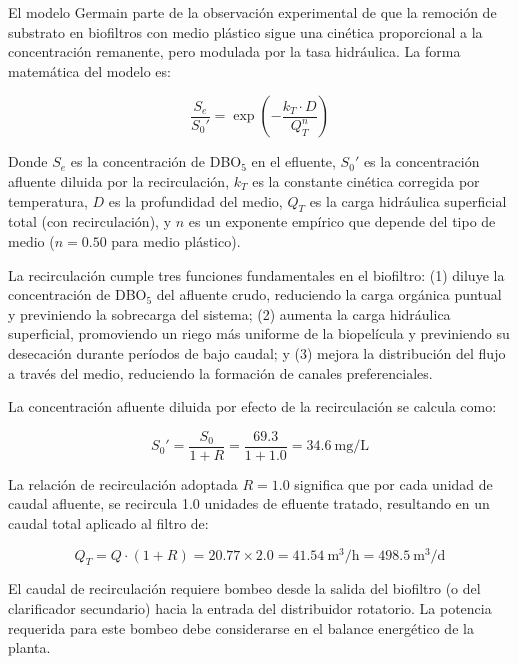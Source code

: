 \documentclass[12pt,a4paper]{article}
\begin{document}
El modelo Germain parte de la observación experimental de que la remoción de substrato en biofiltros con medio plástico sigue una cinética proporcional a la concentración remanente, pero modulada por la tasa hidráulica. La forma matemática del modelo es:

\begin{equation}
\frac{S_e}{S_0'} = \exp\!\left(-\frac{k_T \cdot D}{Q_T^n}\right)
\end{equation}

Donde $S_e$ es la concentración de DBO$_5$ en el efluente, $S_0'$ es la concentración afluente diluida por la recirculación, $k_T$ es la constante cinética corregida por temperatura, $D$ es la profundidad del medio, $Q_T$ es la carga hidráulica superficial total (con recirculación), y $n$ es un exponente empírico que depende del tipo de medio ($n = 0.50$ para medio plástico).

La recirculación cumple tres funciones fundamentales en el biofiltro: (1) diluye la concentración de DBO$_5$ del afluente crudo, reduciendo la carga orgánica puntual y previniendo la sobrecarga del sistema; (2) aumenta la carga hidráulica superficial, promoviendo un riego más uniforme de la biopelícula y previniendo su desecación durante períodos de bajo caudal; y (3) mejora la distribución del flujo a través del medio, reduciendo la formación de canales preferenciales.

La concentración afluente diluida por efecto de la recirculación se calcula como:

\begin{equation}
S_0' = \frac{S_0}{1 + R} = \frac{69.3}{1 + 1.0} = 34.6\ \text{mg/L}
\end{equation}

La relación de recirculación adoptada $R = 1.0$ significa que por cada unidad de caudal afluente, se recircula 1.0 unidades de efluente tratado, resultando en un caudal total aplicado al filtro de:

\begin{equation}
Q_T = Q \cdot (1 + R) = 20.77 \times 2.0 = 41.54\ \text{m}^3\text{/h} = 498.5\ \text{m}^3\text{/d}
\end{equation}

El caudal de recirculación requiere bombeo desde la salida del biofiltro (o del clarificador secundario) hacia la entrada del distribuidor rotatorio. La potencia requerida para este bombeo debe considerarse en el balance energético de la planta.
\end{document}
